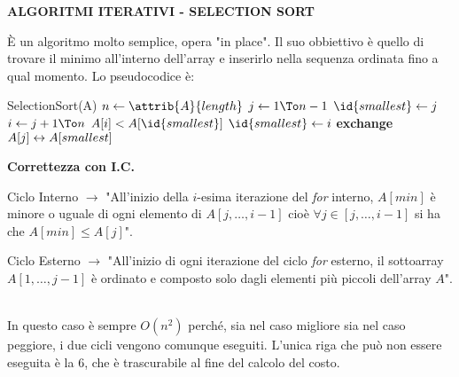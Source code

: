 \documentclass[8pt]{extarticle}
\begin{document}
\begin{formulario}
		\begin{tcenter}
\textbf{ALGORITMI ITERATIVI - SELECTION SORT}
		\end{tcenter}
È un algoritmo molto semplice, opera "in place". Il suo obbiettivo è quello di trovare il minimo all'interno dell'array e inserirlo nella sequenza ordinata fino a qual momento. Lo pseudocodice è: \\		
		\begin{code}{SelectionSort(A)}
\li $n\la\attrib{A}{length}$
\li \For $j\la1 \To n-1$ \Do
	\li $\id{smallest}\la j$
	\li \For $i \la j+1 \To n$ \Do
		\li \If $A[i]<A[\id{smallest}]$ \Then
			\li $\id{smallest}\la i$
		\End
	\End
	\li \bf{exchange }$A[j]\leftrightarrow A[smallest]$
		\end{code}				
\textbf{Correttezza con I.C.}
		\begin{descr}{1}
\item[Ciclo Interno] $\rightarrow$ "All'inizio della $i$-esima iterazione del \textit{for} interno, $A[min]$ è minore o uguale di ogni elemento di $A[j,\dots,i-1]$ cioè $\forall j\in [j,\dots,i-1]$ si ha che $A[min]\leq A[j]$". 
\item[Ciclo Esterno] $\rightarrow$ "All'inizio di ogni iterazione del ciclo \textit{for} esterno, il sottoarray $A[1,\dots,j-1]$ è ordinato e composto solo dagli elementi più piccoli dell'array $A$".
		\end{descr}
\\
In questo caso è sempre $O(n^2)$ perché, sia nel caso migliore sia nel caso peggiore, i due cicli  vengono comunque eseguiti. L'unica riga che può non essere eseguita è la 6, che è trascurabile al fine del calcolo del costo.\\
\myRule


\end{formulario}
\end{document}
